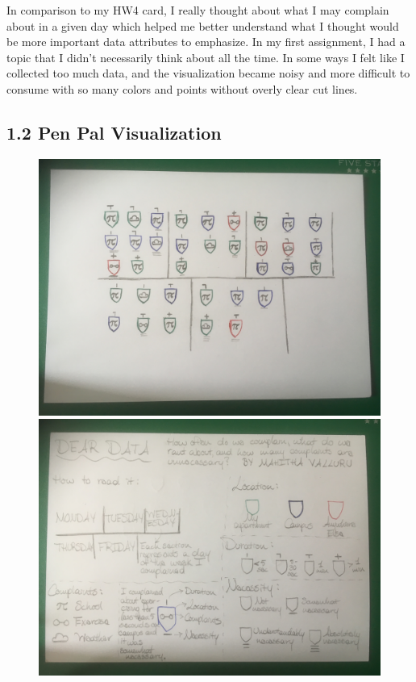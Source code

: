 \documentclass{neu_handout}
\begin{document}
In comparison to my HW4 card, I really thought about what I may complain about in a given day which helped me better understand what I thought would be more important data attributes to emphasize. In my first assignment, I had a topic that I didn't necessarily think about all the time. In some ways I felt like I collected too much data, and the visualization became noisy and more difficult to consume with so many colors and points without overly clear cut lines.

\newpage

\subsection*{1.2 Pen Pal Visualization}

\begin{figure}[h]
\centering
{
\includegraphics[width=0.4\linewidth]{Front}
}
{
\includegraphics[width=0.4\linewidth]{Back}
}
\end{figure}
\end{document}
